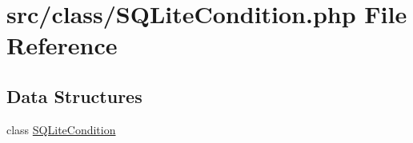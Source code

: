 \hypertarget{_s_q_lite_condition_8php}{}\section{src/class/\+S\+Q\+Lite\+Condition.php File Reference}
\label{_s_q_lite_condition_8php}
\subsection*{Data Structures}
\begin{DoxyCompactItemize}
\item 
class \hyperlink{class_s_q_lite_condition}{S\+Q\+Lite\+Condition}
\end{DoxyCompactItemize}
